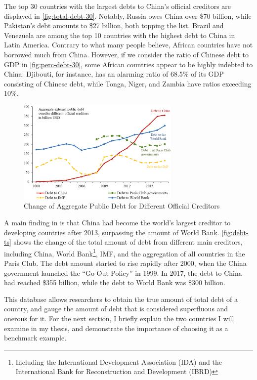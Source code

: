 The top 30 countries with the largest debts to China's official creditors are displayed in \autoref{fig:total-debt-30}. Notably, Russia owes China over \$70 billion, while Pakistan's debt amounts to \$27 billion, both topping the list. Brazil and Venezuela are among the top 10 countries with the highest debt to China in Latin America. Contrary to what many people believe, African countries have not borrowed much from China. However, if we consider the ratio of Chinese debt to GDP in \autoref{fig:perc-debt-30}, some African countries appear to be highly indebted to China. Djibouti, for instance, has an alarming ratio of 68.5\% of its GDP consisting of Chinese debt, while Tonga, Niger, and Zambia have ratios exceeding 10\%.
\begin{figure}
    \centering
    \includegraphics[width = 0.7\textwidth]{fig/temp-external-all-creditor.jpg}
    \caption{Change of Aggregate Public Debt for Different Official Creditors}
    \label{fig:debt-ts}
\end{figure}

A main finding in \citet*{Horn-Reinhart-Trebesch-21} is that China had become the world's largest creditor to developing countries after 2013, surpassing the amount of World Bank. \autoref{fig:debt-ts} shows the change of the total amount of debt from different main creditors, including China, World Bank\footnote{Including the International Development Association (IDA) and the International Bank for Reconstruction and Development (IBRD) }, IMF, and the aggregation of all countries in the Paris Club. The debt amount started to rise rapidly after 2000, when the China government launched the ``Go Out Policy'' in 1999. In 2017, the debt to China had reached \$355 billion, while the debt to World Bank was \$300 billion.


This database allows researchers to obtain the true amount of total debt of a country, and gauge the amount of debt that is considered superfluous and onerous for it.
For the next section, I briefly explain the two countries I will examine in my thesis, and demonstrate the importance of choosing it as a benchmark example.